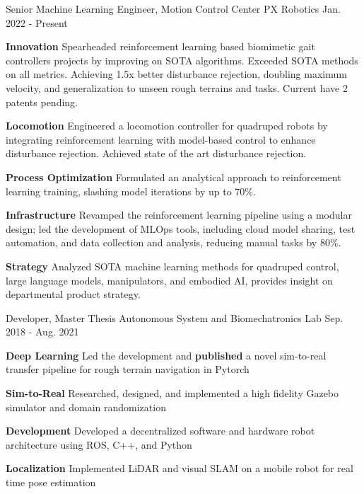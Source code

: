 \begin{cventries}
	\cventry
	{Senior Machine Learning Engineer, Motion Control Center}
	{PX Robotics}
	{Jan. 2022 - Present}
	{}
	{
		\begin{cvitems}
			\item {
				\textbf{Innovation} Spearheaded reinforcement learning based biomimetic gait controllers projects by improving on SOTA algorithms. Exceeded SOTA methods on all metrics. Achieving 1.5x better disturbance rejection, doubling maximum velocity, and generalization to unseen rough terrains and tasks. Current have 2 patents pending.
			}
			\item {
				\textbf{Locomotion} Engineered a locomotion controller for quadruped robots by integrating reinforcement learning with model-based control to enhance disturbance rejection. Achieved state of the art disturbance rejection.
			}
			\item {
				\textbf{Process Optimization} Formulated an analytical approach to reinforcement learning training, slashing model iterations by up to 70\%.
			}
			\item {
				\textbf{Infrastructure} Revamped the reinforcement learning pipeline using a modular design; led the development of MLOps tools, including cloud model sharing, test automation, and data collection and analysis, reducing manual tasks by 80\%.
			}
			\item {
				\textbf{Strategy} Analyzed SOTA machine learning methods for quadruped control, large language models, manipulators, and embodied AI, provides insight on departmental product strategy.
			}
		\end{cvitems}
	}
	\cventry
	{Developer, Master Thesis}
	{Autonomous System and Biomechatronics Lab}
	{Sep. 2018 - Aug. 2021}
	{}
	{
		\begin{cvitems}
			\item {
				\textbf{Deep Learning} Led the development and \textbf{published} a novel sim-to-real transfer pipeline for rough terrain navigation in Pytorch
			}
			\item {
				\textbf{Sim-to-Real} Researched, designed, and implemented a high fidelity Gazebo simulator and domain randomization
			}
			\item {
				\textbf{Development} Developed a decentralized software and hardware robot architecture using ROS, C++, and Python
			}
			\item {
				\textbf{Localization} Implemented LiDAR and visual SLAM on a mobile robot for real time pose estimation
}
\end{cvitems}}
\end{cventries}
